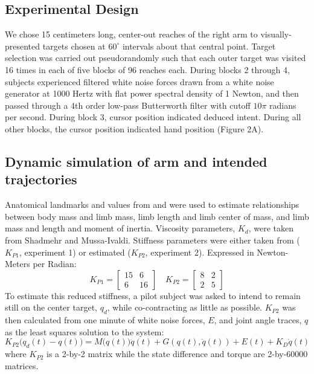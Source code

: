 \documentclass{frontiersSCNS} %
\begin{document}
\begin{methods}
\subsection{Experimental Design}
We chose 15 centimeters long, center-out reaches of the right arm to visually-presented targets chosen at $60^\circ$ intervals about that central point. Target selection was carried out pseudorandomly such that each outer target was visited 16 times in each of five blocks of 96 reaches each. During blocks 2 through 4, subjects experienced filtered white noise forces drawn from a white noise generator at 1000 Hertz with flat power spectral density of 1 Newton, and then passed through a 4th order low-pass Butterworth filter with cutoff $10 \pi$ radians per second. During block 3, cursor position indicated deduced intent. During all other blocks, the cursor position indicated hand position (Figure 2A).

\subsection{Dynamic simulation of arm and intended trajectories}
Anatomical landmarks and values from \cite{dempster1955space} and \cite{winter2009biomechanics} were used to estimate relationships between body mass and limb mass, limb length and limb center of mass, and limb mass and length and moment of inertia. Viscosity parameters, $K_d$, were taken from Shadmehr and Mussa-Ivaldi\cite{shadmehr1994adaptive}. Stiffness parameters were either taken from \cite{shadmehr1994adaptive} ($K_{P1}$, experiment 1) or estimated ($K_{P2}$, experiment 2). Expressed in Newton-Meters per Radian:
\begin{equation}
K_{P1}=
\begin{bmatrix}
15 & 6 \\
6 & 16
\end{bmatrix}
\quad
K_{P2}=
\begin{bmatrix}
8 & 2 \\
2 & 5
\end{bmatrix}
\end{equation}
To estimate this reduced stiffness, a pilot subject was asked to intend to remain still on the center target, $q_d$, while co-contracting as little as possible. $K_{P2}$ was then calculated from one minute of white noise forces, $E$, and joint angle traces, $q$ as the least squares solution to the system:
\begin{equation}
K_{P2}\big(q_d(t)-q(t)\big)=M\big(q(t)\big)\ddot{q}(t)+G(q(t),\dot{q}(t))+E(t)+K_D\dot{q}(t)
\end{equation}
where $K_{P2}$ is a 2-by-2 matrix while the state difference and torque are 2-by-60000 matrices.


\end{methods}
\end{document}
